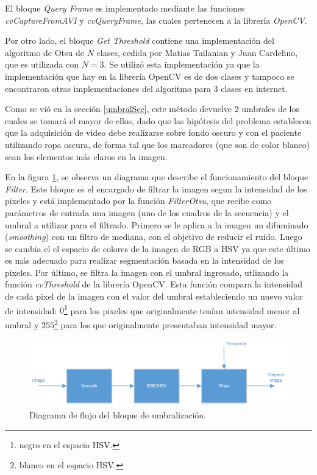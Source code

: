 El bloque \emph{Query Frame} es implementado mediante las funciones \emph{cvCaptureFromAVI} y \emph{cvQueryFrame}, las cuales pertenecen a la librería \emph{OpenCV}\cite{opencv}.


Por otro lado, el bloque \emph{Get Threshold} contiene una implementación del algoritmo de Otsu\cite{otsu} de $N$ clases\cite{implementacionOtsu}, cedida por Matias Tailanian y Juan Cardelino, que es utilizada con $N=3$. Se utilizó esta implementación ya que la implementación que hay en la librería OpenCV\cite{opencv} es de dos clases y tampoco se encontraron otras implementaciones del algoritmo para 3 clases en internet.

 Como se vió en la sección \ref{umbralSec}, este método devuelve 2 umbrales de los cuales se tomará el mayor de ellos, dado que las hipótesis del problema establecen que la adquisición de video debe realizarse sobre fondo oscuro y con el paciente utilizando ropa oscura, de forma tal que los marcadores (que son de color blanco) sean los elementos más claros en la imagen.

En la figura \ref{diagramaumbralizacion}, se observa un diagrama que describe el funcionamiento del bloque \emph{Filter}. Este bloque es el encargado de filtrar la imagen segun la intensidad de los pixeles y está implementado por la función \emph{FilterOtsu}, que recibe como parámetros de entrada una imagen (uno de los cuadros de la secuencia) y el umbral a utilizar para el filtrado. Primero se le aplica a la imagen un difuminado (\textit{smoothing}) con un filtro de mediana, con el objetivo de reducir el ruido. Luego se cambia el el espacio de colores de la imagen de RGB a HSV ya que este último es más adecuado para realizar segmentación basada en la intensidad de los pixeles\cite{HSV}. Por último, se filtra la imagen con el umbral ingresado, utlizando la función \emph{cvThreshold} de la librería OpenCV\cite{opencv}. Esta función compara la intensidad de cada pixel de la imagen con el valor del umbral estableciendo un nuevo valor de intensidad: $0$\footnote{negro en el espacio HSV.} para los pixeles que originalmente tenían intensidad menor al umbral y $255$\footnote{blanco en el espacio HSV.} para los que originalmente presentaban intensidad mayor.

\begin{figure}[H]
\begin{center}
\includegraphics[scale=0.7]{img/diagrama_umbralizacion.png}
\end{center}
\caption{Diagrama de flujo del bloque de umbralización.}
\label{diagramaumbralizacion}
\end{figure}

